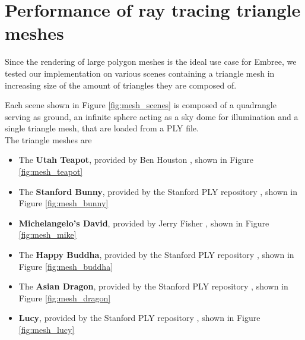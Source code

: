 \section{Performance of ray tracing triangle meshes}
\label{sec:result_meshes}

Since the rendering of large polygon meshes is the ideal use case for Embree, we tested our implementation on various scenes containing a triangle mesh in increasing size of the amount of triangles they are composed of.

Each scene shown in Figure \ref{fig:mesh_scenes} is composed of a quadrangle serving as ground, an infinite sphere acting as a sky dome for illumination and a single triangle mesh, that are loaded from a PLY file. 
\\

\noindent The triangle meshes are 
\begin{itemize}
	\setlength\itemsep{0.05em}
	
	\item The \textbf{Utah Teapot}, provided by Ben Houston \cite{teapot}, shown in Figure \ref{fig:mesh_teapot}
	\item The \textbf{Stanford Bunny}, provided by the Stanford PLY repository \cite{plyRepo}, shown in Figure \ref{fig:mesh_bunny}
	\item \textbf{Michelangelo's David}, provided by Jerry Fisher \cite{david}, shown in Figure \ref{fig:mesh_mike}
	\item The \textbf{Happy Buddha}, provided by the Stanford PLY repository \cite{plyRepo}, shown in Figure \ref{fig:mesh_buddha}
	\item The \textbf{Asian Dragon}, provided by the Stanford PLY repository \cite{plyRepo}, shown in Figure \ref{fig:mesh_dragon}
	\item \textbf{Lucy}, provided by the Stanford PLY repository \cite{plyRepo}, shown in Figure \ref{fig:mesh_lucy}
\end{itemize}

